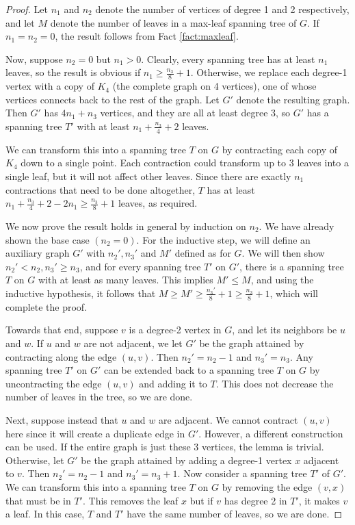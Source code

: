 \documentclass[letterpaper,twoside]{article}
\begin{document}
\begin{proof}
    Let $n_1$ and $n_2$ denote the number of vertices of degree 1
    and 2 respectively, and let $M$ denote the number of leaves in a
    max-leaf spanning tree of $G$. If $n_1 = n_2 = 0$, the result
    follows from Fact \ref{fact:maxleaf}.

    Now, suppose $n_2 = 0$ but $n_1 > 0$. Clearly, every spanning
    tree has at least $n_1$ leaves, so the result is obvious if
    $n_1 \ge \frac{n_3}{8} + 1$. Otherwise, we replace each degree-1 vertex
    with a copy of $K_4$ (the complete graph on 4 vertices), one of whose
    vertices connects back to the rest of the graph. Let $G'$ denote the
    resulting graph. Then $G'$ has $4n_1 + n_3$ vertices, and they are all at
    least degree 3, so $G'$ has a spanning tree $T'$ with at
    least $n_1 + \frac{n_3}{4} + 2$ leaves.

    We can transform this into a spanning tree $T$ on $G$ by
    contracting each copy of $K_4$ down to a single point. Each
    contraction could transform up to 3 leaves into a single leaf,
    but it will not affect other leaves. Since there are exactly
    $n_1$ contractions that need to be done altogether, $T$ has at
    least $n_1 + \frac{n_3}{4} + 2 - 2n_1 \ge \frac{n_3}{8} + 1$
    leaves, as required.

    We now prove the result holds in general by induction on $n_2$.
    We have already shown the base case $(n_2 = 0)$. For the inductive step, we
    will define an auxiliary graph $G'$ with $n_2', n_3'$ and $M'$
    defined as for $G$. We will then show
    $n_2' < n_2, n_3' \ge n_3$, and for every spanning tree $T'$ on $G'$,
    there is a spanning tree $T$ on $G$ with at least as many leaves. This
    implies $M' \le M$, and using the inductive hypothesis, it
    follows that $M \ge M' \ge \frac{n_3'}{8} + 1 \ge \frac{n_3}{8}
    + 1$, which will complete the proof.

    Towards that end, suppose $v$ is a degree-2 vertex in $G$, and
    let its neighbors be $u$ and $w$. If $u$ and $w$ are not
    adjacent, we let $G'$ be the graph attained by contracting along
    the edge $(u,v)$. Then $n_2' = n_2 - 1$ and $n_3' = n_3$. Any
    spanning tree $T'$ on $G'$ can be extended back to a spanning
    tree $T$ on $G$ by uncontracting the edge $(u,v)$ and adding it
    to $T$. This does not decrease the number of leaves in the tree,
    so we are done.

    Next, suppose instead that $u$ and $w$ are adjacent. We cannot
    contract $(u,v)$ here since it will create a duplicate edge in $G'$.
    However, a different construction can be used. If the entire graph is
    just these 3 vertices, the lemma is trivial. Otherwise, let $G'$
    be the graph attained by adding a degree-1 vertex $x$ adjacent
    to $v$. Then $n_2' = n_2 - 1$ and $n_3' = n_3 + 1$. Now consider
    a spanning tree $T'$ of $G'$. We can transform this into a
    spanning tree $T$ on $G$ by removing the edge $(v,x)$ that must
    be in $T'$. This removes the leaf $x$ but if $v$ has degree 2
    in $T'$, it makes $v$ a leaf. In this case, $T$ and $T'$ have the same
    number of leaves, so we are done.


\end{proof}
\end{document}
